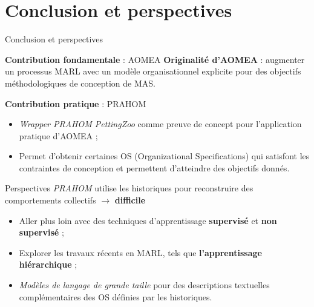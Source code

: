 \section{Conclusion et perspectives}
\begin{frame}{Conclusion et perspectives}
    {}

    \begin{prosblock}{\textbf{Contribution fondamentale} : AOMEA}
        \textbf{Originalité d'AOMEA} : augmenter un processus MARL avec un modèle organisationnel explicite pour des objectifs méthodologiques de conception de MAS.
    \end{prosblock}

    \begin{prosblock}{\textbf{Contribution pratique} : PRAHOM}

        \begin{itemize}
            \item \emph{Wrapper PRAHOM PettingZoo} comme preuve de concept pour l'application pratique d'AOMEA ;
            \item Permet d'obtenir certaines OS (Organizational Specifications) qui satisfont les contraintes de conception et permettent d'atteindre des objectifs donnés.
        \end{itemize}

    \end{prosblock}

    \begin{alertblock}{Perspectives}
        \emph{PRAHOM} utilise les historiques pour reconstruire des comportements collectifs $\rightarrow$ \textbf{difficile}
        \begin{itemize}
            \item Aller plus loin avec des techniques d'apprentissage \textbf{supervisé} et \textbf{non supervisé} ;
            \item Explorer les travaux récents en MARL, tels que \textbf{l'apprentissage hiérarchique} ;
            \item \emph{Modèles de langage de grande taille} pour des descriptions textuelles complémentaires des OS définies par les historiques.
        \end{itemize}
    \end{alertblock}

\end{frame}
